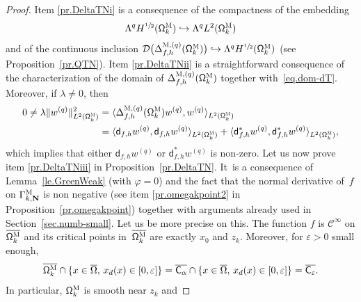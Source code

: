 \documentclass[JEP,XML,SOM,Unicode,NoEqCountersInSection,NoFloatCountersInSection,published]{cedram}
\def\hto{\mathrel{\lhook\joinrel\to}}
\newcommand{\mbf}[1]{\mathbf{#1}}
\let\ve\varepsilon
\theoremstyle{plain}
\theoremstyle{definition}
\begin{document}
\begin{proof}
Item \eqref{pr.DeltaTNi} is a consequence of the compactness
of the embedding\vspace*{-3pt}\enlargethispage{\baselineskip}
\[
\Lambda^q H^{\sfrac12} (\mathsf \Omega_k^{\textsc{M}})\hto
\Lambda^qL^{2} (\mathsf \Omega_k^{\textsc{M}})
\]
and of the
continuous inclusion $\mathcal D\bigl(\Delta_{f,h}^{\textsc{M},(q)} (\mathsf \Omega_k^{\textsc{M}})\bigr) \hto
\Lambda^qH^{\sfrac12} (\mathsf \Omega_k^{\textsc{M}})$ (see Proposition~\ref{pr.QTN}).
Item \eqref{pr.DeltaTNii} is a straightforward consequence
of the characterization of the domain of $\Delta_{f,h}^{\textsc{M},(q)} (\mathsf \Omega_k^{\textsc{M}})$
together with~\eqref{eq.dom-dT}. Moreover, if
$\lambda\neq 0$, then\vspace*{-3pt}
\begin{align*}
0 \neq \lambda\Vert w_{}^{(q)}\Vert^2_{L^{2} (\mathsf \Omega_k^{\textsc{M}})}&= \langle \Delta_{f,h}^{\textsc{M},(q)} (\mathsf \Omega_k^{\textsc{M}})w_{}^{(q)},w_{}^{(q)}\rangle_{L^{2} (\mathsf \Omega_k^{\textsc{M}})}\\
&= \langle \mathsf d_{f,h} w^{(q)},\mathsf d_{f,h}w_{}^{(q)} \rangle_{L^{2} (\mathsf \Omega_k^{\textsc{M}})} +\langle \mathsf d^{*}_{f,h}w_{}^{(q)},\mathsf d^{*}_{f,h}w_{}^{(q)} \rangle_{L^{2} (\mathsf \Omega_k^{\textsc{M}})},
\end{align*}
which implies that either $\mathsf d_{f,h}w_{}^{(q)}$ or $\mathsf d^*_{f,h}w_{}^{(q)}$ is non-zero.
Let us now prove item \eqref{pr.DeltaTNiii} in Proposition~\ref{pr.DeltaTN}. It~is
a consequence of Lemma~\ref{le.GreenWeak} (with $\varphi=0$) and the
fact that the normal derivative of~$f$ on $\Gamma_{k,\mbf
N}^{\textsc{M}}$ is non negative (see item \ref{pr.omegakpoint2} in
Proposition~\ref{pr.omegakpoint}) together with arguments already used in Section~\ref{sec.numb-small}. Let us be more precise on this. The function $f$ is $\mathcal C^\infty$ on $\overline {\mathsf \Omega_k^{\textsc{M}}}$ and its critical points in~$\overline {\mathsf \Omega_k^{\textsc{M}}}$ are exactly $x_0$ and $z_k$.
Moreover, for $\ve >0$ small enough,\vspace*{-3pt}
\begin{equation}
\label{eq.=vec}
\overline {\mathsf \Omega_k^{\textsc{M}}}\cap \{x\in \overline \Omega,\, x_d(x) \in [0,\ve]\}= \overline {\mathsf C_\alpha }\cap \{x\in \overline \Omega,\, x_d(x)\in [0,\ve]\} =\overline {\mathsf C_\ve }.
\end{equation}
In particular, $ \mathsf \Omega_k^{\textsc{M}}$ is smooth near $z_k$ and\vspace*{-3pt}

\end{proof}
\end{document}
